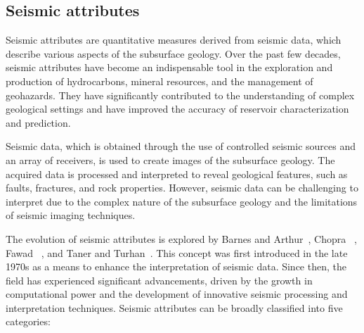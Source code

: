 \subsection{Seismic attributes}
\label{subsec:seismic-attributes}

Seismic attributes are quantitative measures derived from seismic data, which describe various aspects of the subsurface geology.
Over the past few decades, seismic attributes have become an indispensable tool in the exploration and production of hydrocarbons, mineral resources, and the management of geohazards.
They have significantly contributed to the understanding of complex geological settings and have improved the accuracy of reservoir characterization and prediction.

Seismic data, which is obtained through the use of controlled seismic sources and an array of receivers, is used to create images of the subsurface geology.
The acquired data is processed and interpreted to reveal geological features, such as faults, fractures, and rock properties.
However, seismic data can be challenging to interpret due to the complex nature of the subsurface geology and the limitations of seismic imaging techniques.

The evolution of seismic attributes is explored by Barnes and Arthur~\cite{barnes2001seismic}, Chopra \etal~\cite{chopra2005seismic}, Fawad \etal~\cite{fawad2020seismic}, and Taner and Turhan~\cite{taner2001seismic}.
This concept was first introduced in the late 1970s as a means to enhance the interpretation of seismic data.
Since then, the field has experienced significant advancements, driven by the growth in computational power and the development of innovative seismic processing and interpretation techniques.
Seismic attributes can be broadly classified into five categories:

